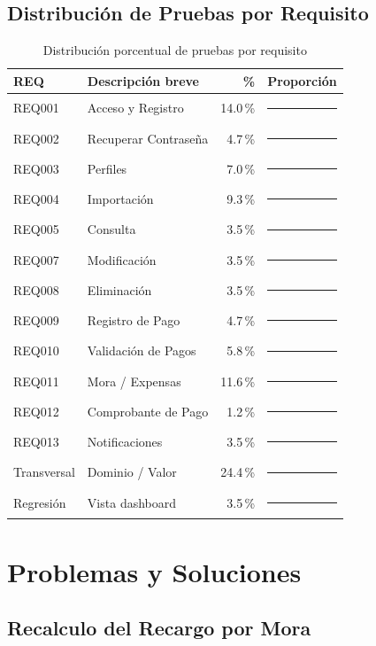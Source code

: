 \documentclass[12pt,a4paper]{article}
\begin{document}
\subsection{Distribución de Pruebas por Requisito}

\begin{table}[H]
\centering
\caption{Distribución porcentual de pruebas por requisito}
\label{tab:distribucion}
\begin{tabular}{llrl}
\toprule
\textbf{REQ} & \textbf{Descripción breve} & \textbf{\%} & \textbf{Proporción} \\
\midrule
REQ001 & Acceso y Registro & 14.0\,\% & \rule{56pt}{6pt} \\
REQ002 & Recuperar Contraseña & 4.7\,\% & \rule{19pt}{6pt} \\
REQ003 & Perfiles & 7.0\,\% & \rule{28pt}{6pt} \\
REQ004 & Importación & 9.3\,\% & \rule{37pt}{6pt} \\
REQ005 & Consulta & 3.5\,\% & \rule{14pt}{6pt} \\
REQ007 & Modificación & 3.5\,\% & \rule{14pt}{6pt} \\
REQ008 & Eliminación & 3.5\,\% & \rule{14pt}{6pt} \\
REQ009 & Registro de Pago & 4.7\,\% & \rule{19pt}{6pt} \\
REQ010 & Validación de Pagos & 5.8\,\% & \rule{23pt}{6pt} \\
REQ011 & Mora / Expensas & 11.6\,\% & \rule{46pt}{6pt} \\
REQ012 & Comprobante de Pago & 1.2\,\% & \rule{5pt}{6pt} \\
REQ013 & Notificaciones & 3.5\,\% & \rule{14pt}{6pt} \\
Transversal & Dominio / Valor & 24.4\,\% & \rule{98pt}{6pt} \\
Regresión & Vista dashboard & 3.5\,\% & \rule{14pt}{6pt} \\
\bottomrule
\end{tabular}
\end{table}

\clearpage

\section{Problemas y Soluciones}

\subsection{Recalculo del Recargo por Mora}
\end{document}
